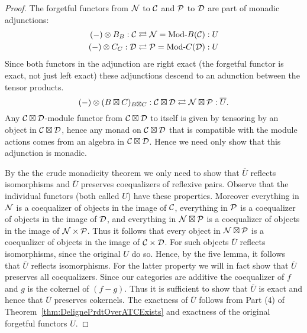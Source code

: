 \documentclass{amsart}
\begin{document}
\begin{proof}
	The forgetful functors from $\mathcal N$ to $\mathcal C$ and $\mathcal P$ to $\mathcal D$ are part of monadic adjunctions:
	\begin{align*}
		(-) \otimes B_{B}:\cC \rightleftarrows \cN = \Mod{}{B}(\cC): U \\
		(-) \otimes C_{C}:\cD \rightleftarrows \cP = \Mod{}{C}(\cD): U
	\end{align*}
	Since both functors in the adjunction are right exact (the forgetful functor is exact, not just left exact) these adjunctions descend to an adunction between the tensor products. 
	\begin{equation*}
		(-) \otimes (B \boxtimes C)_{B \boxtimes C}: \mathcal C \boxtimes \mathcal D \rightleftarrows \mathcal N \boxtimes \mathcal P: \overline{U}.
	\end{equation*}
	Any $\mathcal C \boxtimes \mathcal D$-module functor from $\mathcal C \boxtimes \mathcal D$ to itself is given by tensoring by an object in $\mathcal C \boxtimes \mathcal D$, hence any monad on $\mathcal C \boxtimes \mathcal D$ that is compatible with the module actions comes from an algebra in $\mathcal C \boxtimes \mathcal D$.    
	Hence we need only show that this adjunction is monadic.  
	
	
	By the the crude monadicity theorem \cite[\S~3.5]{MR771116} we only need to show that $\overline{U}$ reflects isomorphisms and $\overline{U}$ preserves coequalizers of reflexive pairs.  Observe that the individual functors (both called $U$) have these properties. Moreover everything in $\mathcal N$ is a coequalizer of objects in the image of $\mathcal C$, everything in $\mathcal P$ is a coequalizer of objects in the image of $\mathcal D$, and everything in $\mathcal N \boxtimes \mathcal P$ is a coequalizer of objects in the image of $\mathcal N \times \mathcal P$. Thus it follows that every object in $\mathcal N \boxtimes \mathcal P$ is a coequalizer of objects in the image of $\mathcal C \times \mathcal D$. For such objects $\overline{U}$ reflects isomorphisms, since the original $U$ do so. Hence, by the five lemma, it follows that $\overline{U}$ reflects isomorphisms. 
   
For the latter property we will in fact show that $\overline{U}$ preserves all coequalizers. Since our categories are additive the coequalizer of $f$ and $g$ is the cokernel of $(f-g)$.  Thus it is sufficient to show that $\overline{U}$ is exact and hence that $\overline{U}$ preserves cokernels.  The exactness of $\overline{U}$ follows from Part (4) of Theorem~\ref{thm:DelignePrdtOverATCExists} and exactness of the original forgetful functors $U$.  
\end{proof}




\end{document}
